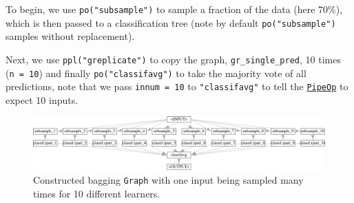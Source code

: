 To begin, we use \texttt{po("subsample")} to sample a fraction of the
data (here 70\%), which is then passed to a classification tree (note by
default \texttt{po("subsample")} samples without replacement).

\begin{Shaded}
\begin{Highlighting}[]
\OtherTok{=} \NormalTok{(}\NormalTok{, } \NormalTok{) }\SpecialCharTok{\%\textgreater{}\textgreater{}\%} \NormalTok{(}\NormalTok{)}
\end{Highlighting}
\end{Shaded}

Next, we use \texttt{ppl("greplicate")} to copy the graph,
\texttt{gr\_single\_pred}, 10 times (\texttt{n\ =\ 10}) and finally
\texttt{po("classifavg")} to take the majority vote of all predictions,
note that we pass \texttt{innum\ =\ 10} to \texttt{"classifavg"} to tell
the
\href{https://mlr3pipelines.mlr-org.com/reference/PipeOp.html}{\texttt{PipeOp}}
to expect 10 inputs.

\begin{Shaded}
\begin{Highlighting}[]
\OtherTok{=} \NormalTok{(}\NormalTok{, } \NormalTok{)}
\OtherTok{=}\SpecialCharTok{\%\textgreater{}\textgreater{}\%} \NormalTok{(}\NormalTok{, } \NormalTok{)}
\SpecialCharTok{$}\NormalTok{()}
\end{Highlighting}
\end{Shaded}

\begin{figure}

{\centering \includegraphics[width=1\textwidth,height=\textheight]{chapters/chapter8/non-sequential_pipelines_and_tuning_files/figure-pdf/fig-pipelines-bagginggraph-1.png}

}

\caption{\label{fig-pipelines-bagginggraph}Constructed bagging
\texttt{Graph} with one input being sampled many times for 10 different
learners.}

\end{figure}

